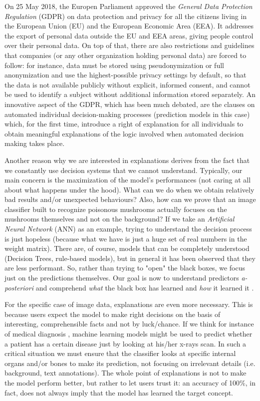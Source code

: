 \documentclass[12pt, twoside, a4paper]{report}
\begin{document}
On 25 May 2018, the Europen Parliament approved the \textit{General Data Protection Regulation} (GDPR) on data protection and privacy for all the citizens living in the European Union (EU) and the European Economic Area (EEA). It addresses the export of personal data outside the EU and EEA areas, giving people control over their personal data. On top of that, there are also restrictions and guidelines that companies (or any other organization holding personal data) are forced to follow: for instance, data must be stored using pseudonymization or full anonymization and use the highest-possible privacy settings by default, so that the data is not available publicly without explicit, informed consent, and cannot be used to identify a subject without additional information stored separately.
An innovative aspect of the GDPR, which has been much debated, are the clauses on automated individual decision-making processes (prediction models in this case) which, for the first time, introduce a right of explanation for all individuals to obtain meaningful explanations of the logic involved when automated decision making takes place.

Another reason why we are interested in explanations derives from the fact that we constantly use decision systems that we cannot understand. Typically, our main concern is the maximization of the model's performances (not caring at all about what happens under the hood). What can we do when we obtain relatively bad results and/or unexpected behaviours? Also, how can we prove that an image classifier built to recognize poisonous mushrooms actually focuses on the mushrooms themselves and not on the background?
If we take an \textit{Artificial Neural Network} (ANN) as an example, trying to understand the decision process is just hopeless (because what we have is just a huge set of real numbers in the weight matrix). 
There are, of course, models that can be completely understood (Decision Trees, rule-based models), but in general it has been observed that they are less performant. So, rather than trying to "open" the black boxes, we focus just on the predictions themselves. Our goal is now to understand predictors \textit{a-posteriori} and comprehend \textit{what} the black box has learned and \textit{how} it learned it \cite{fong}.

For the specific case of image data, explanations are even more necessary. This is because users expect the model to make right decisions on the basis of interesting, comprehensible facts and not by luck/chance. If we think for instance of medical diagnosis \cite{healthcare}, machine learning models might be used to predict whether a patient has a certain disease just by looking at his/her x-rays scan. In such a critical situation we must ensure that the classifier looks at specific internal organs and/or bones to make its prediction, not focusing on irrelevant details (i.e. background, text annotations). 
The whole point of explanations is not to make the model perform better, but rather to let users trust it: an accuracy of 100\%, in fact, does not always imply that the model has learned the target concept.
\end{document}
